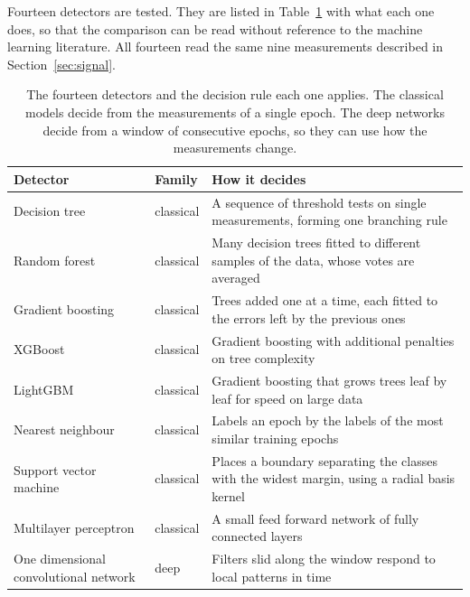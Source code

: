 Fourteen detectors are tested. They are listed in Table~\ref{tab:detectors} with what
each one does, so that the comparison can be read without reference to the machine
learning literature. All fourteen read the same nine measurements described in
Section~\ref{sec:signal}.

\begin{table}[t]
\centering
\caption{The fourteen detectors and the decision rule each one applies. The classical
models decide from the measurements of a single epoch. The deep networks decide from a
window of consecutive epochs, so they can use how the measurements change.}
\label{tab:detectors}
\begin{tabular}{@{}p{3.6cm}lp{7.0cm}@{}}
\toprule
Detector & Family & How it decides \\
\midrule
Decision tree      & classical & A sequence of threshold tests on single measurements,
                                 forming one branching rule \citep{breiman2001random} \\
Random forest      & classical & Many decision trees fitted to different samples of the
                                 data, whose votes are averaged \citep{breiman2001random} \\
Gradient boosting  & classical & Trees added one at a time, each fitted to the errors
                                 left by the previous ones \citep{friedman2001greedy} \\
XGBoost            & classical & Gradient boosting with additional penalties on tree
                                 complexity \citep{chen2016xgboost} \\
LightGBM           & classical & Gradient boosting that grows trees leaf by leaf for
                                 speed on large data \citep{ke2017lightgbm} \\
Nearest neighbour  & classical & Labels an epoch by the labels of the most similar
                                 training epochs \\
Support vector machine & classical & Places a boundary separating the classes with the
                                 widest margin, using a radial basis kernel \\
Multilayer perceptron & classical & A small feed forward network of fully connected
                                 layers \\
\midrule
One dimensional convolutional network & deep & Filters slid along the window respond to
                                 local patterns in time \\

\end{tabular}
\end{table}
